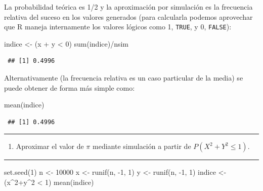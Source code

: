 \documentclass[
  10pt,
]{book}
\newenvironment{Shaded}{\begin{snugshade}}{\end{snugshade}}
\newcommand{\DecValTok}[1]{\textcolor[rgb]{0.00,0.00,0.81}{#1}}
\newcommand{\FunctionTok}[1]{\textcolor[rgb]{0.00,0.00,0.00}{#1}}
\newcommand{\NormalTok}[1]{#1}
\newcommand{\OtherTok}[1]{\textcolor[rgb]{0.56,0.35,0.01}{#1}}
\newcommand{\SpecialCharTok}[1]{\textcolor[rgb]{0.00,0.00,0.00}{#1}}
\providecommand{\tightlist}{%
  \setlength{\itemsep}{0pt}\setlength{\parskip}{0pt}}
\theoremstyle{break}
\theoremstyle{nonumberplain}
\begin{document}
La probabilidad teórica es 1/2 y la aproximación por simulación es la frecuencia relativa del suceso en los valores generados (para calcularla podemos aprovechar que R maneja internamente los valores lógicos como 1, \texttt{TRUE}, y 0, \texttt{FALSE}):

\begin{Shaded}
\begin{Highlighting}[]
\NormalTok{indice }\OtherTok{\textless{}{-}}\NormalTok{ (x }\SpecialCharTok{+}\NormalTok{ y }\SpecialCharTok{\textless{}} \DecValTok{0}\NormalTok{)}
\FunctionTok{sum}\NormalTok{(indice)}\SpecialCharTok{/}\NormalTok{nsim}
\end{Highlighting}
\end{Shaded}

\begin{verbatim}
 ## [1] 0.4996
\end{verbatim}

Alternativamente (la frecuencia relativa es un caso particular de la media) se puede obtener de forma más simple como:

\begin{Shaded}
\begin{Highlighting}[]
\FunctionTok{mean}\NormalTok{(indice)}
\end{Highlighting}
\end{Shaded}

\begin{verbatim}
 ## [1] 0.4996
\end{verbatim}

\begin{center}\rule{0.5\linewidth}{0.5pt}\end{center}

\begin{enumerate}
\def\labelenumi{\alph{enumi})}
\setcounter{enumi}{1}
\tightlist
\item
  Aproximar el valor de \(\pi\) mediante simulación a partir de
  \(P\left( X^2 +Y^2 \leq 1 \right)\).
\end{enumerate}

\begin{center}\rule{0.5\linewidth}{0.5pt}\end{center}

\begin{Shaded}
\begin{Highlighting}[]
\FunctionTok{set.seed}\NormalTok{(}\DecValTok{1}\NormalTok{)}
\NormalTok{n }\OtherTok{\textless{}{-}} \DecValTok{10000}
\NormalTok{x }\OtherTok{\textless{}{-}} \FunctionTok{runif}\NormalTok{(n, }\SpecialCharTok{{-}}\DecValTok{1}\NormalTok{, }\DecValTok{1}\NormalTok{)}
\NormalTok{y }\OtherTok{\textless{}{-}} \FunctionTok{runif}\NormalTok{(n, }\SpecialCharTok{{-}}\DecValTok{1}\NormalTok{, }\DecValTok{1}\NormalTok{)}
\NormalTok{indice }\OtherTok{\textless{}{-}}\NormalTok{ (x}\SpecialCharTok{\^{}}\DecValTok{2}\SpecialCharTok{+}\NormalTok{y}\SpecialCharTok{\^{}}\DecValTok{2} \SpecialCharTok{\textless{}} \DecValTok{1}\NormalTok{)}
\FunctionTok{mean}\NormalTok{(indice)}
\end{Highlighting}
\end{Shaded}
\end{document}
